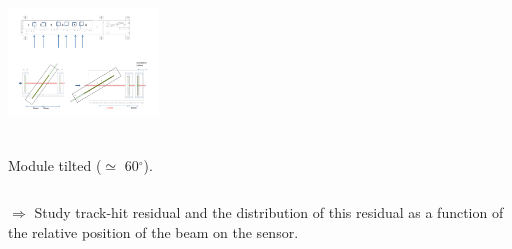 \documentclass{beamer}
\newcommand{\grille}{
    \begin{tikzpicture}[overlay,remember picture]
        \begin{scope}[shift={(current page.south west)}]
            \draw[gray!50] (0,0) grid[step=2mm] (current page.north east);
            \draw[red!50] (0,0) grid[step=1cm] (current page.north east);
            \draw (0.2,1) node {1};
            \draw (0.2,2) node {2};
            \draw (0.2,3) node {3};
            \draw (0.2,4) node {4};
            \draw (0.2,5) node {5};
            \draw (0.2,6) node {6};
            \draw (0.2,7) node {7};
            \draw (0.2,8) node {8};
            \draw (0.2,9) node {9};
            \draw (1,0.5) node {1};
            \draw (2,0.5) node {2};
            \draw (3,0.5) node {3};
            \draw (4,0.5) node {4};
            \draw (5,0.5) node {5};
            \draw (6,0.5) node {6};
            \draw (7,0.5) node {7};
            \draw (8,0.5) node {8};
            \draw (9,0.5) node {9};
            \draw (10,0.5) node {10};
            \draw (11,0.5) node {11};
            \draw (12,0.5) node {12};
        \end{scope}
    \end{tikzpicture}
}
\newcommand{\degres}{\ensuremath{^\circ}}
\begin{document}
\begin{frame}
\begin{columns}[t]
      \begin{column}{4cm}
        \begin{center}
          \includegraphics[width = 4cm,height = 4.0cm]{Pictures/tb_cern_11_sketch_tilted120mm.pdf}

          \footnotesize{Module tilted ($\simeq$ 60\degres).}
        \end{center}
      \end{column}
    \end{columns}

    \footnotesize{$\Rightarrow$ Study track-hit residual and the distribution of this residual as a function of the relative position of the beam on the sensor.

    }
\end{frame}
\end{document}
